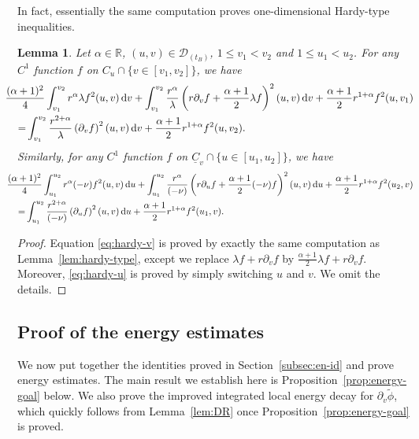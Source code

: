 \documentclass[10pt, reqno]{amsart}
\newtheorem{lemma}[theorem]{Lemma}
\theoremstyle{definition}
\theoremstyle{remark}
\theoremstyle{conjecture}
\numberwithin{equation}{section}
\newcommand{\set}[1]{\{#1\}}
\newcommand{\ud}{\mathrm{d}}
\newcommand{\rd}{\partial}
\newcommand{\0}{\emptyset}
\newcommand{\alp}{\alpha}
\newcommand{\lmb}{\lambda}
\newcommand{\bbR}{\mathbb R}
\newcommand{\calD}{\mathcal D}
\newcommand{\uC}{\underline{C}}
\newcommand{\dur}{\nu}
\newcommand{\dvr}{\lmb}
\newcommand{\phibg}{\overline{\phi}}				%
\newcommand{\phidf}{\widetilde{\phi}}				%
\begin{document}
In fact, essentially the same computation proves one-dimensional Hardy-type inequalities.
\begin{lemma} \label{lem:hardy-opt}
Let $\alp \in \bbR$, $(u, v) \in \calD_{(t_{B})}$, $1 \leq v_{1} < v_{2}$ and $1 \leq u_{1} < u_{2}$. For any $C^{1}$ function $f$ on $C_{u} \cap \set{v \in [v_{1}, v_{2}]}$, we have
\begin{equation} \label{eq:hardy-v}
\begin{aligned}
& \hskip-2em
	\frac{(\alp +1)^{2}}{4} \int_{v_{1}}^{v_{2}} r^{\alp} \dvr f^{2} (u, v) \, \ud v
	+ \int_{v_{1}}^{v_{2}} \frac{r^{\alp}}{\dvr} \left(r \rd_{v} f + \frac{\alp + 1}{2} \dvr f \right)^{2} (u, v) \, \ud v 
	+ \frac{\alp + 1}{2} r^{1+\alp} f^{2}(u, v_{1}) \\
	= & \int_{v_{1}}^{v_{2}} \frac{r^{2+\alp}}{\dvr} \left(\rd_{v} f \right)^{2} (u, v) \, \ud v 
		 + \frac{\alp + 1}{2} r^{1+\alp} f^{2}(u, v_{2}).
\end{aligned}
\end{equation}
Similarly, for any $C^{1}$ function $f$ on $\uC_{v} \cap \set{u \in [u_{1}, u_{2}]}$, we have
\begin{equation} \label{eq:hardy-u}
\begin{aligned}
& \hskip-2em
	\frac{(\alp +1)^{2}}{4} \int_{u_{1}}^{u_{2}} r^{\alp} (-\dur) f^{2} (u, v) \, \ud u
	+ \int_{u_{1}}^{u_{2}} \frac{r^{\alp}}{(-\dur)} \left(r \rd_{u} f + \frac{\alp + 1}{2} (-\dur) f \right)^{2} (u, v) \, \ud u 
	  + \frac{\alp + 1}{2} r^{1+\alp} f^{2}(u_{2}, v) \\
	= & \int_{u_{1}}^{u_{2}} \frac{r^{2+\alp}}{(-\dur)} \left(\rd_{u} f \right)^{2} (u, v) \, \ud u 
		+ \frac{\alp + 1}{2} r^{1+\alp} f^{2}(u_{1}, v).
\end{aligned}
\end{equation}
\end{lemma}
\begin{proof}
Equation \eqref{eq:hardy-v} is proved by exactly the same computation as Lemma~\ref{lem:hardy-type}, except we replace $\dvr f + r \rd_{v} f$ by $\frac{\alp+1}{2} \dvr f + r \rd_{v} f$. Moreover, \eqref{eq:hardy-u} is proved by simply switching $u$ and $v$. We omit the details. \qedhere
\end{proof}

\subsection{Proof of the energy estimates} \label{subsec:en-pf}
We now put together the identities proved in Section~\ref{subsec:en-id} and prove energy estimates. The main result we establish here is Proposition~\ref{prop:energy-goal} below. We also prove the improved integrated local energy decay for $\rd_{v} \phidf$, which quickly follows from Lemma~\ref{lem:DR} once Proposition~\ref{prop:energy-goal} is proved.
\end{document}
